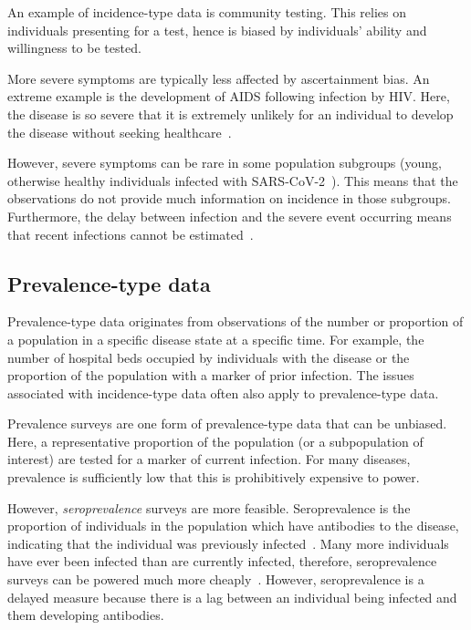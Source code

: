 \documentclass[thesis.tex]{subfiles}
\begin{document}
An example of incidence-type data is community testing.
This relies on individuals presenting for a test, hence is biased by individuals' ability and willingness to be tested.

More severe symptoms are typically less affected by ascertainment bias.
An extreme example is the development of AIDS following infection by HIV.
Here, the disease is so severe that it is extremely unlikely for an individual to develop the disease without seeking healthcare~\autocite{evansCompleteness}.

However, severe symptoms can be rare in some population subgroups (\eg young, otherwise healthy individuals infected with SARS-CoV-2~\autocite{wardSero,bhopalChildren}).
This means that the observations do not provide much information on incidence in those subgroups.
Furthermore, the delay between infection and the severe event occurring means that recent infections cannot be estimated~\autocite{swallow2022challenges}.

\subsection{Prevalence-type data}

Prevalence-type data originates from observations of the number or proportion of a population in a specific disease state at a specific time.
For example, the number of hospital beds occupied by individuals with the disease or the proportion of the population with a marker of prior infection.
The issues associated with incidence-type data often also apply to prevalence-type data.

Prevalence surveys are one form of prevalence-type data that can be unbiased.
Here, a representative proportion of the population (or a subpopulation of interest) are tested for a marker of current infection.
For many diseases, prevalence is sufficiently low that this is prohibitively expensive to power.

However, \emph{seroprevalence} surveys are more feasible.
Seroprevalence is the proportion of individuals in the population which have antibodies to the disease, indicating that the individual was previously infected~\autocite{cdcSeroprevalence}.
Many more individuals have ever been infected than are currently infected, therefore, seroprevalence surveys can be powered much more cheaply~\autocite{wuSeroprevSimulation}.
However, seroprevalence is a delayed measure because there is a lag between an individual being infected and them developing antibodies.
\end{document}
